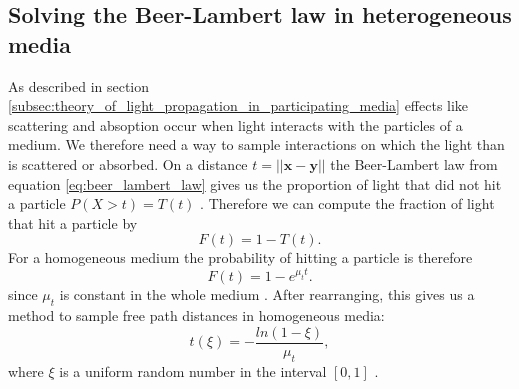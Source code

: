 \subsection{Solving the Beer-Lambert law in heterogeneous media}
\label{subsec:solving_beer_lambert_law_in_heterogeneous_media}
As described in section \ref{subsec:theory_of_light_propagation_in_participating_media} effects like scattering and absoption occur when light interacts with the particles of a medium.
We therefore need a way to sample interactions on which the light than is scattered or absorbed.
On a distance $t=||\boldsymbol{x} - \boldsymbol{y}||$ the Beer-Lambert law from equation \ref{eq:beer_lambert_law} gives us the proportion of light that did not hit a particle $P(X > t) = T(t)$ \cite[p. 5]{novak_overview}.
Therefore we can compute the fraction of light that hit a particle by \cite[p. 5]{novak_overview}
\begin{equation}
    F(t) = 1 - T(t).
\end{equation}
For a homogeneous medium the probability of hitting a particle is therefore
\begin{equation}
    F(t) = 1 - e^{\mu_t t}.
\end{equation}
since $\mu_t$ is constant in the whole medium \cite[p. 5]{novak_overview}.
After rearranging, this gives us a method to sample free path distances in homogeneous media:
\begin{equation}
    \label{eq:distance_sampling}
    t(\xi) = -\frac{ln(1-\xi)}{\mu_t},
\end{equation}
where $\xi$ is a uniform random number in the interval $[0, 1]$ \cite[p. 5]{novak_overview}.

